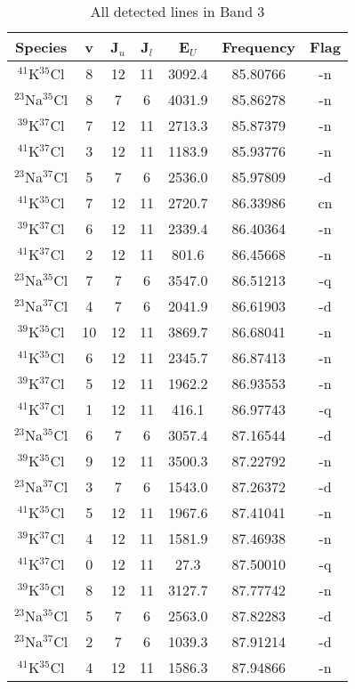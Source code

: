 \begin{table*}[htp]
\centering
\caption{All detected lines in Band 3}
\begin{tabular}{ccccccc}
\label{tab:all_detections_B3}
Species & v & J$_u$ & J$_l$ & E$_U$ & Frequency & Flag \\
\hline
$^{41}$K$^{35}$Cl & 8 & 12 & 11 & 3092.4 & 85.80766 & -n \\
$^{23}$Na$^{35}$Cl & 8 & 7 & 6 & 4031.9 & 85.86278 & -n \\
$^{39}$K$^{37}$Cl & 7 & 12 & 11 & 2713.3 & 85.87379 & -n \\
$^{41}$K$^{37}$Cl & 3 & 12 & 11 & 1183.9 & 85.93776 & -n \\
$^{23}$Na$^{37}$Cl & 5 & 7 & 6 & 2536.0 & 85.97809 & -d \\
$^{41}$K$^{35}$Cl & 7 & 12 & 11 & 2720.7 & 86.33986 & cn \\
$^{39}$K$^{37}$Cl & 6 & 12 & 11 & 2339.4 & 86.40364 & -n \\
$^{41}$K$^{37}$Cl & 2 & 12 & 11 & 801.6 & 86.45668 & -n \\
$^{23}$Na$^{35}$Cl & 7 & 7 & 6 & 3547.0 & 86.51213 & -q \\
$^{23}$Na$^{37}$Cl & 4 & 7 & 6 & 2041.9 & 86.61903 & -d \\
$^{39}$K$^{35}$Cl & 10 & 12 & 11 & 3869.7 & 86.68041 & -n \\
$^{41}$K$^{35}$Cl & 6 & 12 & 11 & 2345.7 & 86.87413 & -n \\
$^{39}$K$^{37}$Cl & 5 & 12 & 11 & 1962.2 & 86.93553 & -n \\
$^{41}$K$^{37}$Cl & 1 & 12 & 11 & 416.1 & 86.97743 & -q \\
$^{23}$Na$^{35}$Cl & 6 & 7 & 6 & 3057.4 & 87.16544 & -d \\
$^{39}$K$^{35}$Cl & 9 & 12 & 11 & 3500.3 & 87.22792 & -n \\
$^{23}$Na$^{37}$Cl & 3 & 7 & 6 & 1543.0 & 87.26372 & -d \\
$^{41}$K$^{35}$Cl & 5 & 12 & 11 & 1967.6 & 87.41041 & -n \\
$^{39}$K$^{37}$Cl & 4 & 12 & 11 & 1581.9 & 87.46938 & -n \\
$^{41}$K$^{37}$Cl & 0 & 12 & 11 & 27.3 & 87.50010 & -q \\
$^{39}$K$^{35}$Cl & 8 & 12 & 11 & 3127.7 & 87.77742 & -n \\
$^{23}$Na$^{35}$Cl & 5 & 7 & 6 & 2563.0 & 87.82283 & -d \\
$^{23}$Na$^{37}$Cl & 2 & 7 & 6 & 1039.3 & 87.91214 & -d \\
$^{41}$K$^{35}$Cl & 4 & 12 & 11 & 1586.3 & 87.94866 & -n \\

\end{tabular}
\end{table*}
